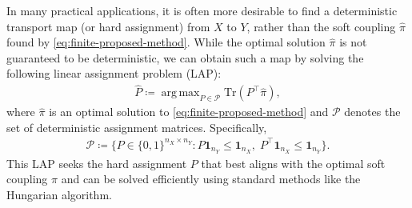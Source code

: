 \documentclass{article}
\DeclareMathOperator*{\argmax}{arg\,max}
\begin{document}
In many practical applications, it is often more desirable to find a deterministic transport map (or hard assignment) from $X$ to $Y$, rather than the soft coupling $\hat{\pi}$ found by \eqref{eq:finite-proposed-method}. While the optimal solution $\hat{\pi}$ is not guaranteed to be deterministic, we can obtain such a map by solving the following linear assignment problem (LAP):
\begin{align}
	\label{eq:finite-projection-method}
	\hat{P} \coloneqq \argmax_{P \in \mathcal{P}} \mathrm{Tr}(P^\top\hat{\pi}) ,
\end{align}
where $\hat{\pi}$ is an optimal solution to \eqref{eq:finite-proposed-method} and $\mathcal{P}$ denotes the set of deterministic assignment matrices. Specifically, 
\begin{align}
	\label{eq:assign-matrix-space}
	\mathcal{P} \coloneqq \{P \in \{0,1\}^{n_X \times n_Y}: P\mathbf{1}_{n_Y} \leq \mathbf{1}_{n_X}, \; P^\top\mathbf{1}_{n_X} \leq \mathbf{1}_{n_Y}\} .
\end{align}
This LAP seeks the hard assignment $P$ that best aligns with the optimal soft coupling $\hat{\pi}$ and can be solved efficiently using standard methods like the Hungarian algorithm.
\end{document}
